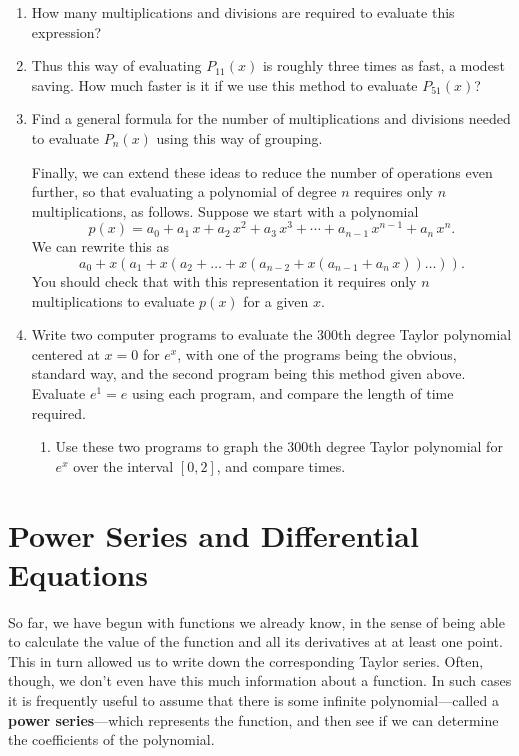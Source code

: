 \begin{enumerate}
\item How many multiplications and divisions are required to evaluate
this expression?  


\item Thus this way of evaluating $P_{11}(x)$ is roughly three times as
fast, a modest saving.  How much faster is it if we use this method to
evaluate $P_{51}(x)$?



\item Find a general formula for the number of multiplications and
divisions needed to evaluate $P_n(x)$ using this way of grouping.




Finally, we can extend these ideas to reduce the number of operations
even further, so that evaluating a polynomial of degree $n$ requires
only $n$ multiplications, as follows.  Suppose we start with a
polynomial
\[
p(x) = a_0 +a_1\,x+a_2\,x^2+a_3\,x^3 + \cdots +a_{n-1}\,x^{n-1}+a_n\,x^n.
\]
We can rewrite this as
\[
a_0+x\left(a_1+x\left(a_2+\ldots 
   +x\left(a_{n-2}+x\left(a_{n-1}+a_n\,x\right)\right)\ldots\right)\right).
\]
You should check that with this representation it requires only $n$
multiplications to evaluate $p(x)$ for a given $x$.


\item Write two computer programs to evaluate the 300th degree Taylor
polynomial centered at $x=0$ for $e^x$, with one of the programs being
the obvious, standard way, and the second program being this method
given above. Evaluate $e^1=e$ using each program, and compare the
length of time required.

  \begin{enumerate}
  \item Use these two programs to graph the
300th degree Taylor polynomial for $e^x$ over the interval $[0, 2]$,
and compare times.




\end{enumerate}
\end{enumerate}
\section{Power Series and Differential Equations}
\label{sec:power-series-and-differential-equations}

So far, we have begun with functions we already know, in the sense of
being able to calculate the value of the function and all its
derivatives at at least one point.  This in turn allowed us to write
down the corresponding Taylor series. Often, though, we don't even
have this much information about a function.  In such cases it is
frequently useful to assume that there is some infinite
polynomial---called a {\bf power series}---which
represents the function, and then see if we can determine the
coefficients of the polynomial.

